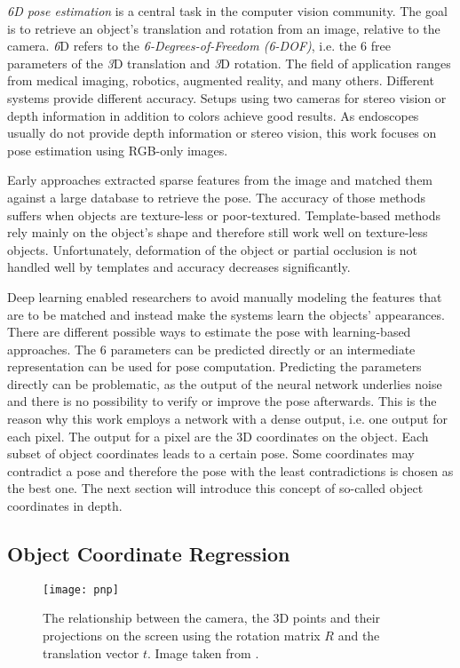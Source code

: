 \textit{6D pose estimation} is a central task in the computer vision community. The goal is to retrieve an object's translation and rotation from an image, relative to the camera. \textit{6}D refers to the \textit{6-Degrees-of-Freedom (6-DOF)}, i.e. the 6 free parameters of the \textit{3}D translation and \textit{3}D rotation. The field of application ranges from medical imaging, robotics, augmented reality, and many others. Different systems provide different accuracy. Setups using two cameras for stereo vision or depth information in addition to colors achieve good results. As endoscopes usually do not provide depth information or stereo vision, this work focuses on pose estimation using RGB-only images. 

Early approaches extracted sparse features from the image and matched them against a large database to retrieve the pose. The accuracy of those methods suffers when objects are texture-less or poor-textured. Template-based methods rely mainly on the object's shape and therefore still work well on texture-less objects. Unfortunately, deformation of the object or partial occlusion is not handled well by templates and accuracy decreases significantly.

Deep learning enabled researchers to avoid manually modeling the features that are to be matched and instead make the systems learn the objects' appearances. There are different possible ways to estimate the pose with learning-based approaches. The 6 parameters can be predicted directly or an intermediate representation can be used for pose computation. Predicting the parameters directly can be problematic, as the output of the neural network underlies noise and there is no possibility to verify or improve the pose afterwards. This is the reason why this work employs a network with a dense output, i.e. one output  for each pixel. The output for a pixel are the 3D coordinates on the object. Each subset of object coordinates leads to a certain pose. Some coordinates may contradict a pose and therefore the pose with the least contradictions is chosen as the best one. The next section will introduce this concept of so-called object coordinates in depth.

\subsection{Object Coordinate Regression} \label{objectcoordinates}

\begin{figure}[!tbp]
	\centering
    \texttt{[image: pnp]}
    \caption{The relationship between the camera, the 3D points and their projections on the screen using the rotation matrix $R$ and the translation vector $t$. Image taken from \cite{opencv_pnp}.}
    	\label{fig:pnp}
\end{figure} 

